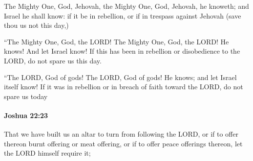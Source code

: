 			\begin{versebox}
					\item[BHS] 
					\item[ASV] The Mighty One, God, Jehovah, the Mighty One, God, Jehovah, he knoweth; and Israel he shall know: if it be in rebellion, or if in trespass against Jehovah (save thou us not this day,)
					\item[NIV] “The Mighty One, God, the LORD! The Mighty One, God, the LORD! He knows! And let Israel know! If this has been in rebellion or disobedience to the LORD, do not spare us this day.
					\item[NRSV] “The LORD, God of gods! The LORD, God of gods! He knows; and let Israel itself know! If it was in rebellion or in breach of faith toward the LORD, do not spare us today
			\end{versebox}

		\paragraph{Joshua 22:23} %
			\label{JOSHUA-22-23}

			That we have built us an altar to turn from following the LORD, or if to offer thereon burnt offering or meat offering, or if to offer peace offerings thereon, let the LORD himself require it;

